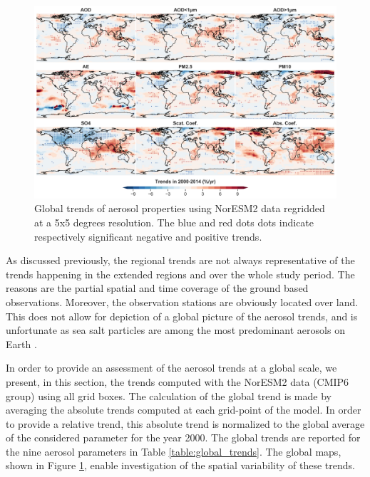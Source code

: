\documentclass[journal abbreviation, manuscript]{copernicus}
\begin{document}
\begin{figure}[t]
 \includegraphics[width=16cm]{../scripts/figs/trends_map2.png}
 \caption{Global trends of aerosol properties using NorESM2 data regridded at a 5x5 degrees resolution. The blue and red dots dots indicate respectively significant negative and positive trends.}
 \label{fig:global_trends}
\end{figure}

As discussed previously, the regional trends are not always representative of the trends happening in the extended regions and over the whole study period. The reasons are the partial spatial and time coverage of the ground based observations. Moreover, the observation stations are obviously located over land. This does not allow for depiction of a global picture of the aerosol trends, and is unfortunate as sea salt particles are among the most predominant aerosols on Earth \citep{schulz2004sea}.

In order to provide an assessment of the aerosol trends at a global scale, we present, in this section, the trends computed with the NorESM2 data (CMIP6 group) using all grid boxes. The calculation of the global trend is made by averaging the absolute trends computed at each grid-point of the model. In order to provide a relative trend, this absolute trend is normalized to the global average of the considered parameter for the year 2000. The global trends are reported for the nine aerosol parameters in Table \ref{table:global_trends}. The global maps, shown in Figure \ref{fig:global_trends}, enable investigation of the spatial variability of these trends.
\end{document}
